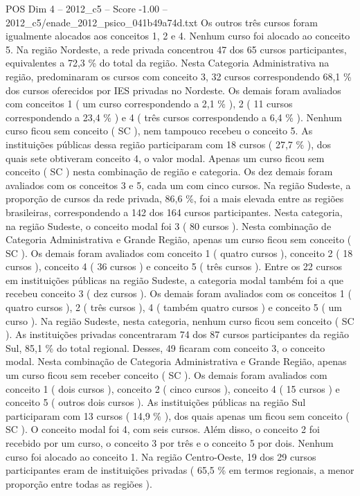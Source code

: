 \begin{textsample}{POS Dim 4 – 2012\_c5 – Score -1.00 – 2012\_c5/enade\_2012\_psico\_041b49a74d.txt}
Os outros três cursos foram igualmente alocados aos conceitos 1, 2 e 4.
Nenhum curso foi alocado ao conceito 5.
Na região Nordeste, a rede privada concentrou 47 dos 65 cursos participantes, equivalentes a 72,3 \% do total da região.
Nesta Categoria Administrativa na região, predominaram os cursos com conceito 3, 32 cursos correspondendo 68,1 \% dos cursos oferecidos por IES privadas no Nordeste.
Os demais foram avaliados com conceitos 1 ( um curso correspondendo a 2,1 \% ), 2 ( 11 cursos correspondendo a 23,4 \% ) e 4 ( três cursos correspondendo a 6,4 \% ).
Nenhum curso ficou sem conceito ( SC ), nem tampouco recebeu o conceito 5.
As instituições públicas dessa região participaram com 18 cursos ( 27,7 \% ), dos quais sete obtiveram conceito 4, o valor modal.
Apenas um curso ficou sem conceito ( SC ) nesta combinação de região e categoria.
Os dez demais foram avaliados com os conceitos 3 e 5, cada um com cinco cursos.
Na região Sudeste, a proporção de cursos da rede privada, 86,6 \%, foi a mais elevada entre as regiões brasileiras, correspondendo a 142 dos 164 cursos participantes.
Nesta categoria, na região Sudeste, o conceito modal foi 3 ( 80 cursos ).
Nesta combinação de Categoria Administrativa e Grande Região, apenas um curso ficou sem conceito ( SC ).
Os demais foram avaliados com conceito 1 ( quatro cursos ), conceito 2 ( 18 cursos ), conceito 4 ( 36 cursos ) e conceito 5 ( três cursos ).
Entre os 22 cursos em instituições públicas na região Sudeste, a categoria modal também foi a que recebeu conceito 3 ( dez cursos ).
Os demais foram avaliados com os conceitos 1 ( quatro cursos ), 2 ( três cursos ), 4 ( também quatro cursos ) e conceito 5 ( um curso ).
Na região Sudeste, nesta categoria, nenhum curso ficou sem conceito ( SC ).
As instituições privadas concentraram 74 dos 87 cursos participantes da região Sul, 85,1 \% do total regional.
Desses, 49 ficaram com conceito 3, o conceito modal.
Nesta combinação de Categoria Administrativa e Grande Região, apenas um curso ficou sem receber conceito ( SC ).
Os demais foram avaliados com conceito 1 ( dois cursos ), conceito 2 ( cinco cursos ), conceito 4 ( 15 cursos ) e conceito 5 ( outros dois cursos ).
As instituições públicas na região Sul participaram com 13 cursos ( 14,9 \% ), dos quais apenas um ficou sem conceito ( SC ).
O conceito modal foi 4, com seis cursos.
Além disso, o conceito 2 foi recebido por um curso, o conceito 3 por três e o conceito 5 por dois.
Nenhum curso foi alocado ao conceito 1.
Na região Centro-Oeste, 19 dos 29 cursos participantes eram de instituições privadas ( 65,5 \% em termos regionais, a menor proporção entre todas as regiões ).

\end{textsample}
